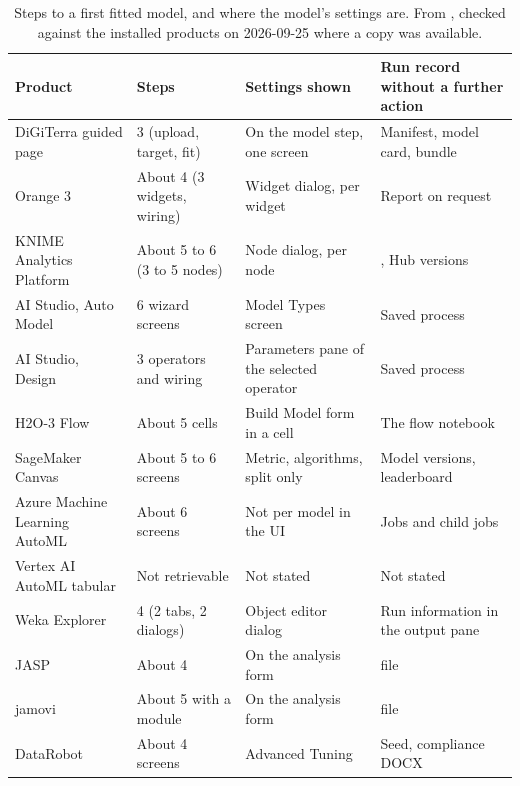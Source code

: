 \begin{table}[htbp]
\caption{Steps to a first fitted model, and where the model's settings are. From , checked against the installed products on 2026-09-25 where a copy was available.}
\label{tab:steps}
\small
\begin{tabular}{@{}L{4.0cm}L{2.6cm}L{4.4cm}L{4.0cm}@{}}
\toprule
Product & Steps & Settings shown & Run record without a further action \\
\midrule
DiGiTerra guided page & 3 (upload, target, fit) & On the model step, one screen & Manifest, model card, bundle \\
Orange 3 & About 4 (3 widgets, wiring) & Widget dialog, per widget & Report on request \\
KNIME Analytics Platform & About 5 to 6 (3 to 5 nodes) & Node dialog, per node & , Hub versions \\
AI Studio, Auto Model & 6 wizard screens & Model Types screen & Saved process \\
AI Studio, Design & 3 operators and wiring & Parameters pane of the selected operator & Saved process \\
H2O-3 Flow & About 5 cells & Build Model form in a cell & The flow notebook \\
SageMaker Canvas & About 5 to 6 screens & Metric, algorithms, split only & Model versions, leaderboard \\
Azure Machine Learning AutoML & About 6 screens & Not per model in the UI & Jobs and child jobs \\
Vertex AI AutoML tabular & Not retrievable & Not stated & Not stated \\
Weka Explorer & 4 (2 tabs, 2 dialogs) & Object editor dialog & Run information in the output pane \\
JASP & About 4 & On the analysis form &  file \\
jamovi & About 5 with a module & On the analysis form &  file \\
DataRobot & About 4 screens & Advanced Tuning & Seed, compliance DOCX \\
\bottomrule
\end{tabular}
\end{table}
